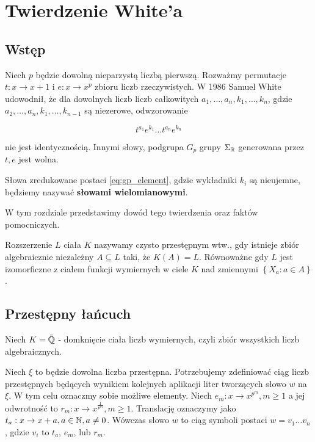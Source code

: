 \chapter{Twierdzenie White'a}

\section{Wstęp}

Niech $p$ będzie dowolną nieparzystą liczbą pierwszą. Rozważmy permutacje $t :
x \rightarrow  x+1$ i $e: x \rightarrow x^p$ zbioru liczb rzeczywistych. W 1986
Samuel White \cite{whi88} udowodnił, że dla dowolnych liczb liczb całkowitych
$a_1, \ldots, a_n, k_1, \ldots, k_n$, gdzie $a_2, \ldots, a_n, k_1, \ldots,
k_{n-1}$ są niezerowe, odwzorowanie 

\begin{equation}
  t^{a_1}e^{k_1}\ldots t^{a_n}e^{k_n}
\label{eq:gp_element}
\end{equation}

nie jest identycznością.  Innymi słowy, podgrupa $G_p$ grupy $\Sigma_{\mathbb{R}}$
generowana przez $t, e$ jest wolna.

Słowa zredukowane postaci \ref{eq:gp_element}, gdzie wykładniki $k_i$ są
nieujemne, będziemy nazywać \textbf{słowami wielomianowymi}.

W tym rozdziale przedstawimy dowód tego twierdzenia oraz faktów pomocniczych.

\begin{defin}
  Rozszerzenie $L$ ciała $K$ nazywamy czysto przestępnym wtw., gdy istnieje
  zbiór algebraicznie niezależny $A \subseteq L$ taki, że $K(A) = L$. Równoważne
  gdy $L$ jest izomorficzne z ciałem funkcji wymiernych w ciele $K$ nad
  zmiennymi $\left\{X_a : a \in A\right\}$.
\end{defin}

\section{Przestępny łańcuch}
\label{sec:przelan}

Niech $K = \bar{\mathbb{Q}}$ - domknięcie ciała liczb wymiernych, czyli zbiór wszystkich
liczb algebraicznych.

Niech $\xi$ to będzie dowolna liczba przestępna. Potrzebujemy zdefiniować ciąg
liczb przestępnych będących wynikiem kolejnych aplikacji liter tworzących słowo
$w$ na $\xi$. W tym celu oznaczmy sobie możliwe elementy. Niech $e_m: x
\rightarrow x^{p^m}, m \geq 1$ a jej odwrotność to $r_m: x \rightarrow
x^{\frac{1}{p^m}}, m \geq 1$. Translację oznaczymy jako $t_a: x \rightarrow x +
a, a \in \mathbb{N}, a \neq 0$.  Wówczas słowo $w$ to ciąg symboli postaci $w =
v_1\ldots v_n$, gdzie $v_i$ to $t_a$, $e_m$, lub $r_m$. 

